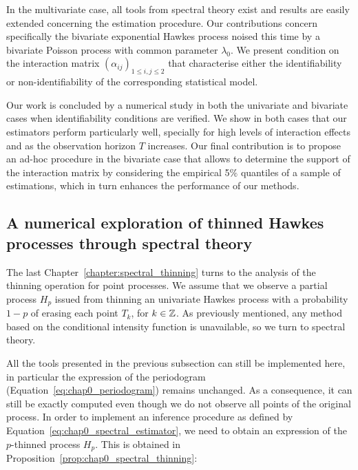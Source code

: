     In the multivariate case, all tools from spectral theory exist and results are easily extended concerning the estimation procedure.
    Our contributions concern specifically the bivariate exponential Hawkes process noised this time by a bivariate Poisson process with common parameter $\lambda_0$.
    We present condition on the interaction matrix $(\alpha_{ij})_{1 \leq i,j \leq 2}$ that characterise either the identifiability or non-identifiability of the corresponding statistical model.

    Our work is concluded by a numerical study in both the univariate and bivariate cases when identifiability conditions are verified.
    We show in both cases that our estimators perform particularly well, specially for high levels of interaction effects and as the observation horizon $T$ increases.
    Our final contribution is to propose an ad-hoc procedure in the bivariate case that allows to determine the support of the interaction matrix by considering the empirical 5$\%$ quantiles of a sample of estimations, which in turn enhances the performance of our methods.
    




    \subsection{A numerical exploration of thinned Hawkes processes through spectral theory}
    The last Chapter~\ref{chapter:spectral_thinning} turns to the analysis of the thinning operation for point processes.
    We assume that we observe a partial process $H_p$ issued from thinning an univariate Hawkes process with a probability $1-p$ of erasing each point $T_k$, for $k\in{\mathbb Z}$.
    As previously mentioned, any method based on the conditional intensity function is unavailable, so we turn to spectral theory.

    All the tools presented in the previous subsection can still be implemented here, in particular the expression of the periodogram (Equation~\eqref{eq:chap0_periodogram}) remains unchanged.
    As a consequence, it can still be exactly computed even though we do not observe all points of the original process.
    In order to implement an inference procedure as defined by Equation~\eqref{eq:chap0_spectral_estimator}, we need to obtain an expression of the $p$-thinned process $H_p$.
    This is obtained in Proposition~\ref{prop:chap0_spectral_thinning}:

